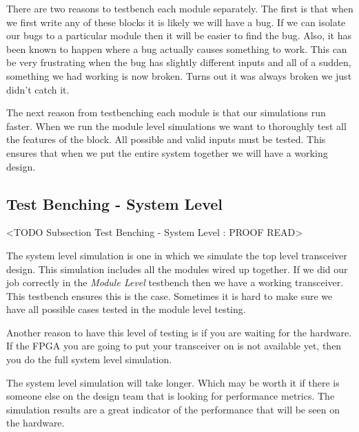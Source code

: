 There are two reasons to testbench each module separately. The first is that when we first write any of these blocks it is likely we will have a bug. If we can isolate our bugs to a particular module then it will be easier to find the bug. Also, it has been known to happen where a bug actually causes something to work. This can be very frustrating when the bug has slightly different inputs and all of a sudden, something we had working is now broken. Turns out it was always broken we just didn't catch it.

The next reason from testbenching each module is that our simulations run faster. When we run the module level simulations we want to thoroughly test all the features of the block. All possible and valid inputs must be tested. This ensures that when we put the entire system together we will have a working design.
	
\subsection{Test Benching - System Level}
	<TODO Subsection Test Benching - System Level : PROOF READ>

The system level simulation is one in which we simulate the top level transceiver design. This simulation includes all the modules wired up together. If we did our job correctly in the \emph{Module Level} testbench then we have a working transceiver. This testbench ensures this is the case. Sometimes it is hard to make sure we have all possible cases tested in the module level testing.

Another reason to have this level of testing is if you are waiting for the hardware. If the \ac{FPGA} you are going to put your transceiver on is not available yet, then you do the full system level simulation.

The system level simulation will take longer. Which may be worth it if there is someone else on the design team that is looking for performance metrics. The simulation results are a great indicator of the performance that will be seen on the hardware.

	
	